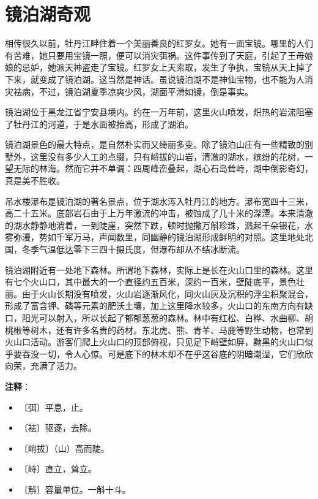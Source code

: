 \documentclass[12pt,UTF-8,openany]{ctexbook}
\begin{document}
\chapter{镜泊湖奇观}

\begin{large}
    
    相传很久以前，牡丹江畔住着一个美丽善良的红罗女。她有一面宝镜。哪里的人们有苦难，她只要用宝镜一照，便可以消灾弭祸。这件事传到了天庭，引起了王母娘娘的忌妒，她派天神盗走了宝镜。红罗女上天索取，发生了争执，宝镜从天上掉了下来，就变成了镜泊湖。这当然是神话。虽说镜泊湖不是神仙宝物，也不能为人消灾袪病，不过，镜泊湖夏季凉爽少风，湖面平滑如镜，倒是事实。
    
    镜泊湖位于黑龙江省宁安县境内。约在一万年前，这里火山喷发，炽热的岩流阻塞了牡丹江的河道，于是水面被抬高，形成了湖泊。
    
    镜泊湖景色的最大特点，是自然朴实而又绮丽多变。除了镜泊山庄有一些精致的别墅外，这里没有多少人工的点缀，只有峭拔的山岩，清澈的湖水，缤纷的花树，一望无际的林海。然而它并不单调：四周峰峦叠起，湖心石岛耸峙，湖中倒影奇幻，真是美不胜收。
    
    吊水楼瀑布是镜泊湖的著名景点，位于湖水泻入牡丹江的地方。瀑布宽四十三米，高二十五米。底部岩石由于上万年激流的冲击，被蚀成了几十米的深潭。本来清澈的湖水静静地淌着，一到陡崖，突然下跌，顿时抛撒万斛珍珠，溅起千朵银花，水雾弥漫，势如千军万马，声闻数里，同幽静的镜泊湖形成鲜明的对照。这里地处北国，冬季气温低达零下三四十摄氏度，但瀑布却从不结冰断流。
    
    镜泊湖附近有一处地下森林。所谓地下森林，实际上是长在火山口里的森林。这里有七个火山口，其中最大的一个直径约五百米，深约一百米，壁陡底平，景色壮丽。由于火山长期没有喷发，火山岩逐渐风化，同火山灰及沉积的浮尘积聚混合，形成了富含钾、磷等元素的肥沃土壤，加上这里降水较多，火山口的东南方向有缺口，阳光可以射入，所以长起了郁郁葱葱的森林。林中有红松、白桦、水曲柳、胡桃楸等树木，还有许多名贵的药材。东北虎、熊、青羊、马鹿等野生动物，也常到火山口活动。游客们爬上火山口的顶部俯视，只见足下峭壁如屏，黝黑的火山口似乎要吞没一切，令人心惊。可是底下的林木却不在乎这谷底的阴暗潮湿，它们欣欣向荣，充满了活力。
    
\end{large}


\newpage

\textbf{注释}：

\vspace{-1em}

\begin{itemize}
    \setlength\itemsep{-0.2em}
    \item 〔弭〕平息，止。
    \item 〔袪〕驱逐，去除。
    \item 〔峭拔〕（山）高而陡。
    \item 〔峙〕直立，耸立。
    \item 〔斛〕容量单位。一斛十斗。
\end{itemize}
\end{document}
